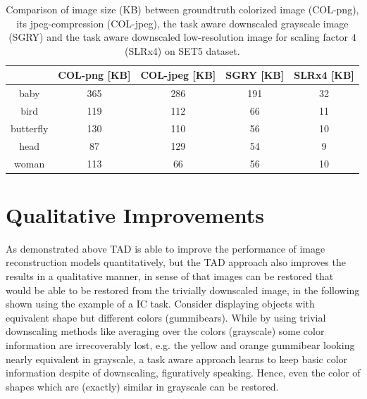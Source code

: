 \begin{table}[!htbp]
	\begin{center}
	\begin{tabular}{c|c|c|c|c}
    & COL-png [KB] & COL-jpeg [KB] & SGRY [KB] & SLRx4 [KB] \\
    \hline
    baby & 365 & 286 & 191 & 32 \\ 
    bird & 119 & 112 & 66 & 11 \\
    butterfly & 130 & 110 & 56 & 10 \\
    head & 87 & 129 & 54 & 9 \\
    woman & 113 & 66 & 56 & 10 \\
	\end{tabular}
	\caption{Comparison of image size (KB) between groundtruth colorized image (COL-png), its jpeg-compression (COL-jpeg), the task aware downscaled grayscale image (SGRY) and the task aware downscaled low-resolution image for scaling factor $4$ (SLRx4) on SET5 dataset. }
	\label{table:slr_size}
	\end{center}
\end{table}

\section{Qualitative Improvements}
\label{sec:Experiments_QI}
As demonstrated above \ac{TAD} is able to improve the performance of
image reconstruction models quantitatively, but the \ac{TAD} approach also improves the results in a qualitative manner, in sense of that images can be restored that would be able to be restored from the trivially downscaled image, in the following shown using the example of a \ac{IC} task.
\newline
Consider  displaying objects with equivalent shape but different colors (gummibears). While by using trivial downscaling methods like averaging over the colors (grayscale) some color information are irrecoverably lost, e.g. the yellow and orange gummibear looking nearly equivalent in grayscale, a task aware approach learns to keep basic color information despite of downscaling, figuratively speaking. Hence, even the color of shapes which are (exactly) similar in grayscale can be restored.

